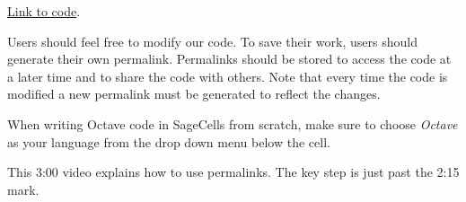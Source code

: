 \documentclass{ximera}
\begin{document}
\href{https://sagecell.sagemath.org/?z=eJxLySwu0FD3SM3JyddRKM8vyklRVNe0BgBW7AcU&lang=octave&interacts=eJyLjgUAARUAuQ==}{Link to code}.

Users should feel free to modify our code.  To save their work, users should generate their own permalink.  Permalinks should be stored to access the code at a later time and to share the code with others.  Note that every time the code is modified a new permalink must be generated to reflect the changes.

When writing Octave code in SageCells from scratch, make sure to choose \emph{Octave} as your language from the drop down menu below the cell.

This 3:00 video explains how to use permalinks.  The key step is just past the 2:15 mark.

\end{document}
